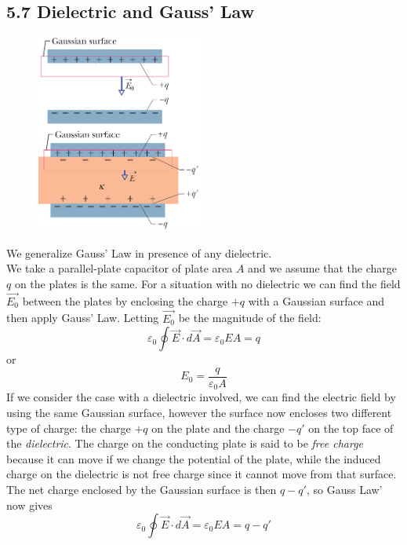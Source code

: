 \documentclass[12pt, a4paper]{article}
\begin{document}
		
		
		\newpage
		
		\subsection*{5.7 Dielectric and Gauss' Law}
		
		\begin{figure}
			\centering
			\includegraphics[width=5.5cm]{Physics2_PNGs/gaussian-surf-dielecs.png}
			\caption*{}
			\label{fig:gaussian-surf-dielecs.png}
		\end{figure}
		We generalize Gauss' Law in presence of any dielectric. \\
		We take a parallel-plate capacitor of plate area $A$ and we assume that the charge $q$ on the plates is the same. For a situation with no dielectric we can find the field $\vec{E_0}$ between the plates by enclosing the charge $+q$ with a Gaussian surface and then apply Gauss' Law. Letting $\vec{E_0}$ be the magnitude of the field:
		\[
			\varepsilon_0 \oint \vec{E} \cdot d\vec{A} = \varepsilon_0 E A = q
			\tag{5-31}
		\]
		or 
		\[
			E_0 = \frac{q}{\varepsilon_0 A}
			\tag{5-32}
		\]
		If we consider the case with a dielectric involved, we can find the electric field by using the same Gaussian surface, however the surface now encloses two different type of charge: the charge $+q$ on the plate and the charge $-q'$ on the top face of the \textit{dielectric}. The charge on the conducting plate is said to be \textit{free charge} because it can move if we change the potential of the plate, while the induced charge on the dielectric is not free charge since it cannot move from that surface. \\
		The net charge enclosed by the Gaussian surface is then $q - q'$, so Gauss Law' now gives
		\[
			\varepsilon_0 \oint \vec{E} \cdot d\vec{A} = \varepsilon_0 E A = q - q'
			\tag{5-33}
		\]
\end{document}

